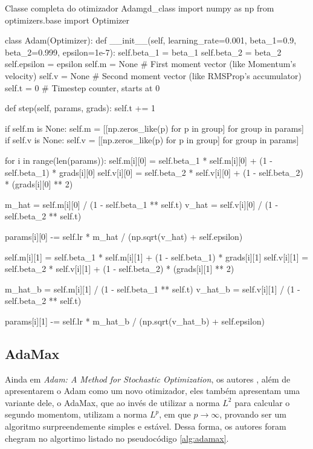 \begin{codelisting}{Classe completa do otimizador Adam}{gd_class}
import numpy as np
from optimizers.base import Optimizer


class Adam(Optimizer):
    def __init__(self, learning_rate=0.001, beta_1=0.9, beta_2=0.999, epsilon=1e-7):
        self.beta_1 = beta_1
        self.beta_2 = beta_2
        self.epsilon = epsilon
        self.m = None  # First moment vector (like Momentum's velocity)
        self.v = None  # Second moment vector (like RMSProp's accumulator)
        self.t = 0  # Timestep counter, starts at 0

    def step(self, params, grads):
        self.t += 1

        if self.m is None:
            self.m = [[np.zeros_like(p) for p in group] for group in params]
        if self.v is None:
            self.v = [[np.zeros_like(p) for p in group] for group in params]

        for i in range(len(params)):
            self.m[i][0] = self.beta_1 * self.m[i][0] + (1 - self.beta_1) * grads[i][0]
            self.v[i][0] = self.beta_2 * self.v[i][0] + (1 - self.beta_2) * (grads[i][0] ** 2)

            m_hat = self.m[i][0] / (1 - self.beta_1 ** self.t)
            v_hat = self.v[i][0] / (1 - self.beta_2 ** self.t)

            params[i][0] -= self.lr * m_hat / (np.sqrt(v_hat) + self.epsilon)

            self.m[i][1] = self.beta_1 * self.m[i][1] + (1 - self.beta_1) * grads[i][1]
            self.v[i][1] = self.beta_2 * self.v[i][1] + (1 - self.beta_2) * (grads[i][1] ** 2)

            m_hat_b = self.m[i][1] / (1 - self.beta_1 ** self.t)
            v_hat_b = self.v[i][1] / (1 - self.beta_2 ** self.t)

            params[i][1] -= self.lr * m_hat_b / (np.sqrt(v_hat_b) + self.epsilon)
\end{codelisting}

\subsection{AdaMax}

Ainda em \textit{Adam: A Method for Stochastic Optimization}, os autores \textcite{AdamMethod}, além de apresentarem o Adam como um novo otimizador, eles também apresentam uma variante dele, o AdaMax, que ao invés de utilizar a norma $L^2$ para calcular o segundo momentom, utilizam a norma $L^p$, em que $p \to \infty$, provando ser um algoritmo surpreendemente simples e estável. Dessa forma, os autores foram  chegram no algortimo listado no pseudocódigo \ref{alg:adamax}.

